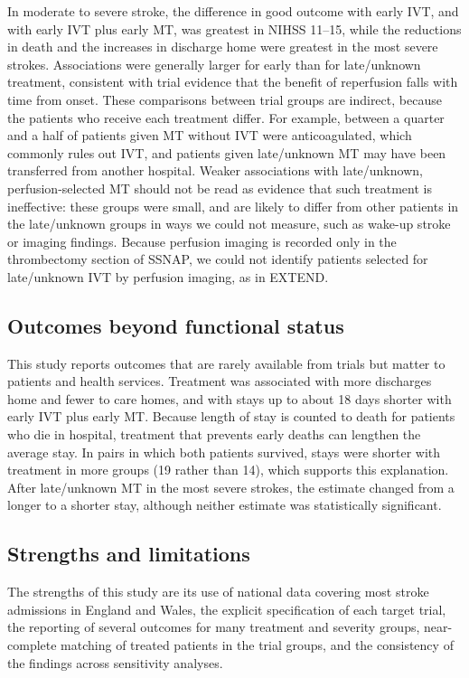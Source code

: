 In moderate to severe stroke, the difference in good outcome with early IVT, and with early IVT plus early MT, was greatest in NIHSS 11--15, while the reductions in death and the increases in discharge home were greatest in the most severe strokes. Associations were generally larger for early than for late/unknown treatment, consistent with trial evidence that the benefit of reperfusion falls with time from onset\cite{emberson_effect_2014, saver_time_2016}. These comparisons between trial groups are indirect, because the patients who receive each treatment differ. For example, between a quarter and a half of patients given MT without IVT were anticoagulated, which commonly rules out IVT, and patients given late/unknown MT may have been transferred from another hospital. Weaker associations with late/unknown, perfusion-selected MT should not be read as evidence that such treatment is ineffective: these groups were small, and are likely to differ from other patients in the late/unknown groups in ways we could not measure, such as wake-up stroke or imaging findings. Because perfusion imaging is recorded only in the thrombectomy section of SSNAP, we could not identify patients selected for late/unknown IVT by perfusion imaging, as in EXTEND\cite{ma_thrombolysis_2019, campbell_extending_2019}.

\subsection{Outcomes beyond functional status}

This study reports outcomes that are rarely available from trials but matter to patients and health services. Treatment was associated with more discharges home and fewer to care homes, and with stays up to about 18 days shorter with early IVT plus early MT. Because length of stay is counted to death for patients who die in hospital, treatment that prevents early deaths can lengthen the average stay. In pairs in which both patients survived, stays were shorter with treatment in more groups (19 rather than 14), which supports this explanation. After late/unknown MT in the most severe strokes, the estimate changed from a longer to a shorter stay, although neither estimate was statistically significant.

\subsection{Strengths and limitations}

The strengths of this study are its use of national data covering most stroke admissions in England and Wales, the explicit specification of each target trial, the reporting of several outcomes for many treatment and severity groups, near-complete matching of treated patients in the trial groups, and the consistency of the findings across sensitivity analyses.

